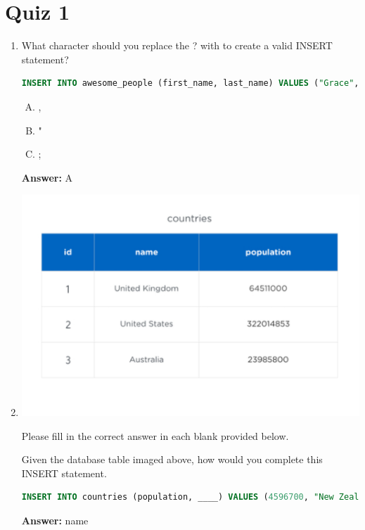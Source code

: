 \documentclass[12pt]{article}
\begin{document}
\bigskip

\section{Quiz 1}

\bigskip


\begin{enumerate}[1.]
    \item

    What character should you replace the ? with to create a valid INSERT
    statement?

    \bigskip

    \begin{lstlisting}[language=SQL]
    INSERT INTO awesome_people (first_name, last_name) VALUES ("Grace", "Hopper")? ("Ada", "Lovelace");
    \end{lstlisting}

    \begin{enumerate}[A.]
        \item ,
        \item "
        \item ;
    \end{enumerate}

    \bigskip

    \textbf{Answer:} A

    \item

    \begin{center}
    \includegraphics[width=0.8 \linewidth]{images/part_1_notes_1.png}
    \end{center}

    Please fill in the correct answer in each blank provided below.

    \bigskip

    Given the database table imaged above, how would you complete this INSERT statement.

    \bigskip

    \begin{lstlisting}[language=SQL]
    INSERT INTO countries (population, ____) VALUES (4596700, "New Zealand");
    \end{lstlisting}

    \bigskip

    \textbf{Answer:} name

\end{enumerate}
\end{document}
